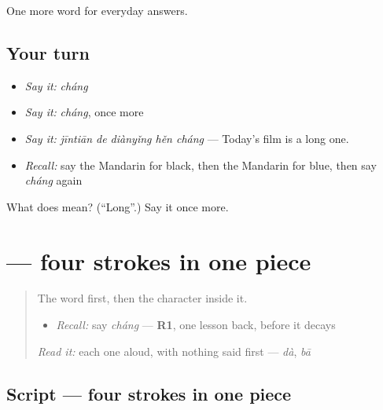 \begin{grammarlens}[title={What you've built}]
One more word for everyday answers.
\end{grammarlens}

\subsection*{Your turn}
\begin{itemize}
\raggedright
  \item \emph{Say it:} \emph{cháng}
  \item \emph{Say it:} \emph{cháng}, once more
  \item \emph{Say it:} \emph{jīntiān de diànyǐng hěn cháng} — Today's film is a long one.
  \item \emph{Recall:} say the Mandarin for black, then the Mandarin for blue, then say \emph{cháng} again
\end{itemize}

\begin{tcolorbox}[breakable,colback=teal!4,colframe=teal!35!black,title={Before you move on}]
What does  mean? (\textquotedblleft{}Long\textquotedblright{}.) Say it once more.
\end{tcolorbox}
\section[\texorpdfstring{\zh{长} (cháng)}{长 (cháng)}]{ — four strokes in one piece}

\label{lesson:ZH-W61-chang-long}



\begin{quote}
The word first, then the character inside it.

\begin{itemize}
\raggedright
  \item \emph{Recall:} say \emph{cháng} — \textbf{R1}, one lesson back, before it decays
\end{itemize}

\begin{quote}
 
\end{quote}

\emph{Read it:} each one aloud, with nothing said first — \emph{dà}, \emph{bā}
\end{quote}

\subsection*{Script — four strokes in one piece}

